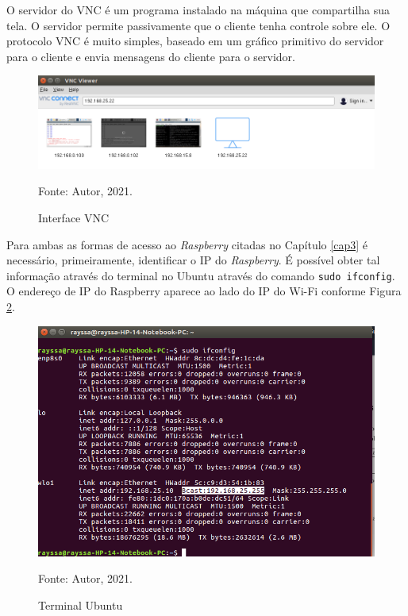 \documentclass[
12pt,
openany, %
oneside, %
a4paper,			
english,			
brazil			        %
]{abntbibufjf}
\begin{document}
	O servidor do VNC é um programa instalado na máquina que compartilha sua tela. O servidor permite passivamente que o cliente tenha controle sobre ele. O protocolo VNC é muito simples, baseado em um gráfico primitivo do servidor para o cliente e envia mensagens do cliente para o servidor.
    
	\begin{figure}[!htb]
		\centering
		\includegraphics[scale=0.55]{Figuras/vnc2.png}
		\caption{Interface VNC}
		\label{vnc}
		\par Fonte: Autor, 2021.
	\end{figure}
	
    Para ambas as formas de acesso ao \textit{Raspberry} citadas no Capítulo \ref{cap3} é necessário, primeiramente, identificar o IP do \textit{Raspberry}. É possível obter tal informação através do terminal no Ubuntu através do comando \texttt{sudo ifconfig}. O endereço de IP do Raspberry aparece ao lado do IP do Wi-Fi conforme Figura \ref{terminalUbuntu}.
	
	\begin{figure}[!htb]
		\centering
		\includegraphics[scale=0.4]{Figuras/terminalUbuntu.png}
		\caption{Terminal Ubuntu}
		\label{terminalUbuntu}
		\par Fonte: Autor, 2021.
	\end{figure}
	
\end{document}
